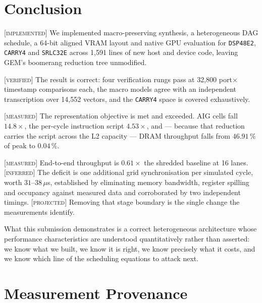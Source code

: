 \documentclass[11pt]{article}
\newcommand{\M}{\textcolor{blue!45!black}{\scriptsize\textsc{[measured]}}}
\newcommand{\V}{\textcolor{green!35!black}{\scriptsize\textsc{[verified]}}}
\newcommand{\I}{\textcolor{note}{\scriptsize\textsc{[implemented]}}}
\newcommand{\F}{\textcolor{purple!60!black}{\scriptsize\textsc{[inferred]}}}
\newcommand{\Pj}{\textcolor{red!55!black}{\scriptsize\textsc{[projected]}}}
\newcommand{\code}[1]{\texttt{\small #1}}
\begin{document}
\section{Conclusion}

\I{} We implemented macro-preserving synthesis, a heterogeneous DAG schedule, a
64-bit aligned VRAM layout and native GPU evaluation for \code{DSP48E2},
\code{CARRY4} and \code{SRLC32E} across 1,591 lines of new host and device code,
leaving GEM's boomerang reduction tree unmodified.

\V{} The result is correct: four verification rungs pass at 32,800 port$\times$timestamp
comparisons each, the macro models agree with an independent transcription over 14,552
vectors, and the \code{CARRY4} space is covered exhaustively.

\M{} The representation objective is met and exceeded. AIG cells fall $14.8\times$,
the per-cycle instruction script $4.53\times$, and --- because that reduction carries
the script across the L2 capacity --- DRAM throughput falls from $46.91\,\%$ of peak
to $0.04\,\%$.

\M{} End-to-end throughput is $0.61\times$ the shredded baseline at 16 lanes. \F{} The
deficit is one additional grid synchronisation per simulated cycle, worth
$31$--$38\,\mu$s, established by eliminating memory bandwidth, register spilling and
occupancy against measured data and corroborated by two independent timings.
\Pj{} Removing that stage boundary is the single change the measurements identify.

What this submission demonstrates is a correct heterogeneous architecture whose
performance characteristics are understood quantitatively rather than asserted: we
know what we built, we know it is right, we know precisely what it costs, and we know
which line of the scheduling equations to attack next.

\section{Measurement Provenance}\label{sec:prov}
\end{document}
